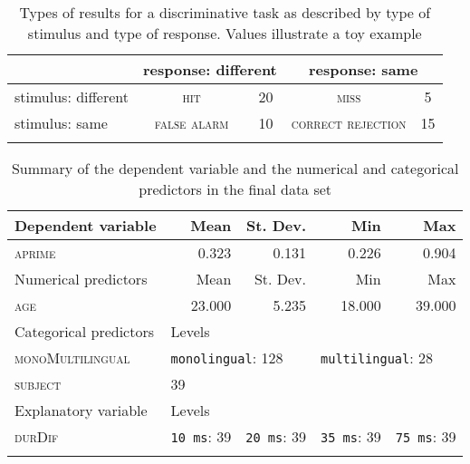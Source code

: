 \begin{table}[H]\fontsize{10}{11}
\caption{Types of results for a discriminative task as described by type of stimulus and type of response. Values illustrate a toy example}
\label{tab:6.9}
\centering
\begin{tabular}{lcccc}
\lsptoprule
\textbf{~}          & \multicolumn{2}{c}{response: different} & \multicolumn{2}{c}{response: same}  \\
\midrule
stimulus: different & \textsc{hit}         & 20                        & \textsc{miss}              & 5               \\
stimulus: same      & \textsc{false alarm} & 10                        & \textsc{correct rejection} & 15              \\
\lspbottomrule
\end{tabular}
\end{table}




\begin{table}[H]\fontsize{10}{11}
\caption{Summary of the dependent variable and the numerical and categorical predictors in the final data set}
\label{tab:6.10}
\centering
\begin{tabular}{lllll} 
\lsptoprule
Dependent variable     & \multicolumn{1}{r}{Mean}        & \multicolumn{1}{r}{St. Dev.}                 & \multicolumn{1}{r}{Min}         & \multicolumn{1}{r}{Max}                       \\ 
\midrule
\textsc{aprime}                 & \multicolumn{1}{r}{0.323}       & \multicolumn{1}{r}{0.131}                    & \multicolumn{1}{r}{0.226}       & \multicolumn{1}{r}{0.904}                     \\ 
\midrule
Numerical predictors   & \multicolumn{1}{r}{Mean}        & \multicolumn{1}{r}{St. Dev.}                 & \multicolumn{1}{r}{Min}         & \multicolumn{1}{r}{Max}                       \\ 
\midrule
\textsc{age}                    & \multicolumn{1}{r}{23.000}      & \multicolumn{1}{r}{5.235}                    & \multicolumn{1}{r}{18.000}      & \multicolumn{1}{r}{39.000}                    \\ 
\midrule
Categorical predictors & Levels      & ~                        & ~           & ~                         \\ 
\midrule
\textsc{monoMultilingual}       & \multicolumn{2}{l}{\texttt{monolingual}:
  128} & \multicolumn{2}{l}{\texttt{multilingual}:
  28}  \\
\textsc{subject}                & 39          & ~                        & ~           & ~                         \\ 
\midrule
Explanatory variable   & Levels      & ~                        & ~           & ~                         \\ 
\midrule
\textsc{durDif}                 & \texttt{10 ms}:
  39 & \texttt{20 ms}:
  39              & \texttt{35 ms}:
  39 & \texttt{75 ms}:
  39               \\
\lspbottomrule
\end{tabular}
\end{table}






